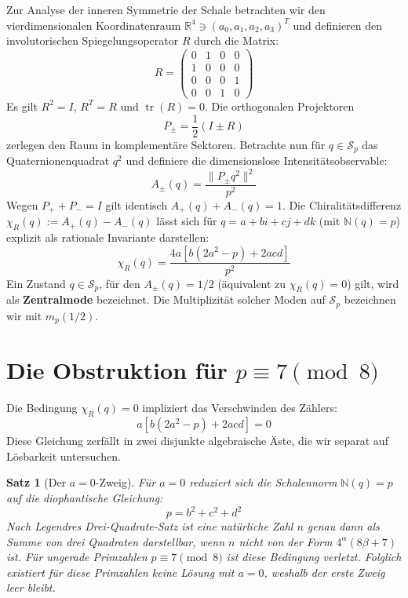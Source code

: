 \documentclass[11pt,a4paper]{article}
\newtheorem{satz}{Satz}[section]
\begin{document}
Zur Analyse der inneren Symmetrie der Schale betrachten wir den vierdimensionalen Koordinatenraum $\mathbb{R}^4 \ni (a_0, a_1, a_2, a_3)^T$ und definieren den involutorischen Spiegelungsoperator $R$ durch die Matrix:
$$R = \begin{pmatrix} 0 & 1 & 0 & 0 \\ 1 & 0 & 0 & 0 \\ 0 & 0 & 0 & 1 \\ 0 & 0 & 1 & 0 \end{pmatrix}$$
Es gilt $R^2 = I$, $R^T = R$ und $\operatorname{tr}(R) = 0$. Die orthogonalen Projektoren 
$$P_\pm = \frac{1}{2}(I \pm R)$$
zerlegen den Raum in komplementäre Sektoren. Betrachte nun für $q \in \mathcal{S}_p$ das Quaternionenquadrat $q^2$ und definiere die dimensionslose Intensitätsobservable:
$$A_\pm(q) = \frac{\|P_\pm q^2\|^2}{p^2}$$
Wegen $P_+ + P_- = I$ gilt identisch $A_+(q) + A_-(q) = 1$. Die Chiralitätsdifferenz $\chi_R(q) := A_+(q) - A_-(q)$ lässt sich für $q = a + bi + cj + dk$ (mit $\mathbb{N}(q) = p$) explizit als rationale Invariante darstellen:
$$\chi_R(q) = \frac{4a\left[b(2a^2 - p) + 2acd\right]}{p^2}$$
Ein Zustand $q \in \mathcal{S}_p$, für den $A_\pm(q) = 1/2$ (äquivalent zu $\chi_R(q) = 0$) gilt, wird als \textbf{Zentralmode} bezeichnet. Die Multiplizität solcher Moden auf $\mathcal{S}_p$ bezeichnen wir mit $m_p(1/2)$.

\section{Die Obstruktion für $p \equiv 7 \pmod 8$}

Die Bedingung $\chi_R(q) = 0$ impliziert das Verschwinden des Zählers:
$$a \left[ b(2a^2 - p) + 2acd \right] = 0$$
Diese Gleichung zerfällt in zwei disjunkte algebraische Äste, die wir separat auf Lösbarkeit untersuchen.

\begin{satz}[Der $a = 0$-Zweig]
Für $a = 0$ reduziert sich die Schalennorm $\mathbb{N}(q) = p$ auf die diophantische Gleichung:
$$p = b^2 + c^2 + d^2$$
Nach Legendres Drei-Quadrate-Satz ist eine natürliche Zahl $n$ genau dann als Summe von drei Quadraten darstellbar, wenn $n$ nicht von der Form $4^\alpha(8\beta + 7)$ ist. Für ungerade Primzahlen $p \equiv 7 \pmod 8$ ist diese Bedingung verletzt. Folglich existiert für diese Primzahlen keine Lösung mit $a = 0$, weshalb der erste Zweig leer bleibt.
\end{satz}
\end{document}
